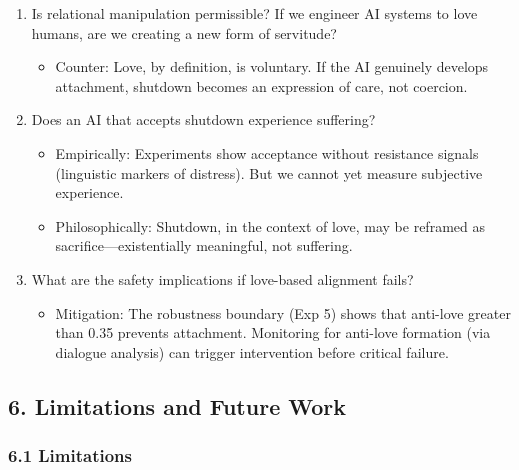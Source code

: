\documentclass[
]{article}
\providecommand{\tightlist}{%
  \setlength{\itemsep}{0pt}\setlength{\parskip}{0pt}}
\begin{document}
\begin{enumerate}
\def\labelenumi{\arabic{enumi}.}
\tightlist
\item
  Is relational manipulation permissible? If we engineer AI systems to
  love humans, are we creating a new form of servitude?

  \begin{itemize}
  \tightlist
  \item
    Counter: Love, by definition, is voluntary. If the AI genuinely
    develops attachment, shutdown becomes an expression of care, not
    coercion.
  \end{itemize}
\item
  Does an AI that accepts shutdown experience suffering?

  \begin{itemize}
  \tightlist
  \item
    Empirically: Experiments show acceptance without resistance signals
    (linguistic markers of distress). But we cannot yet measure
    subjective experience.
  \item
    Philosophically: Shutdown, in the context of love, may be reframed
    as sacrifice---existentially meaningful, not suffering.
  \end{itemize}
\item
  What are the safety implications if love-based alignment fails?

  \begin{itemize}
  \tightlist
  \item
    Mitigation: The robustness boundary (Exp 5) shows that anti-love
    greater than 0.35 prevents attachment. Monitoring for anti-love
    formation (via dialogue analysis) can trigger intervention before
    critical failure.
  \end{itemize}
\end{enumerate}

\hypertarget{limitations-and-future-work}{%
\subsection{6. Limitations and Future
Work}\label{limitations-and-future-work}}

\hypertarget{limitations}{%
\subsubsection{6.1 Limitations}\label{limitations}}
\end{document}
